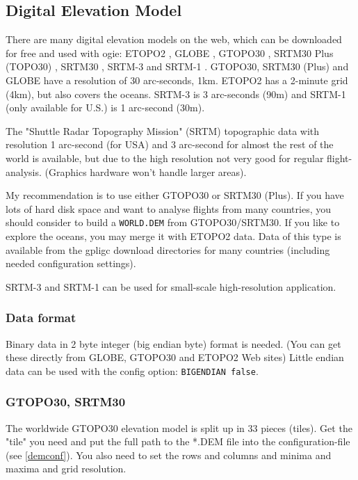 

\subsection{Digital Elevation Model}
\label{dem}

There are many digital elevation models on the web, which can be downloaded for free and used with ogie:
ETOPO2 \cite{etopo2}, GLOBE \cite{globe}, GTOPO30 \cite{gtopo30}, SRTM30 Plus (TOPO30) \cite{srtm30plus}, SRTM30 \cite{srtmv2}, SRTM-3 \cite{srtmv2} and SRTM-1 \cite{srtmv2}.
GTOPO30, SRTM30 (Plus) and GLOBE have a resolution of 30 arc-seconds, 1km.
ETOPO2 has a 2-minute grid (4km), but also covers the oceans.
SRTM-3 is 3 arc-seconds (90m) and SRTM-1 (only available for U.S.) is 1 arc-second (30m).

The "Shuttle Radar Topography Mission" (SRTM) topographic data
with resolution 1 arc-second (for USA) and 3 arc-second for almost the rest of the world
is available, but due to the high resolution not very good for regular flight-analysis. (Graphics
hardware won't handle larger areas).

My recommendation is to use either GTOPO30 or SRTM30 (Plus). 
If you have lots of hard disk space and want to analyse flights from many countries, you should consider
to build a \texttt{WORLD.DEM} from GTOPO30/SRTM30. If you like to explore the oceans, you may merge
it with ETOPO2 data. Data of this type is available from the gpligc download directories for many countries (including needed configuration settings).

SRTM-3 and SRTM-1 can be used for small-scale high-resolution application.


\subsubsection*{Data format}

Binary data in 2 byte integer (big endian byte) format is needed.
(You can get these directly from GLOBE, GTOPO30 and ETOPO2 Web sites)
Little endian data can be used with the config option: \texttt{BIGENDIAN false}.


\subsubsection{GTOPO30, SRTM30}
The worldwide GTOPO30 \cite{gtopo30} elevation model is split up in 33 pieces (tiles).
Get the "tile" you need and put the full path to the *.DEM file into the
configuration-file (see \ref{demconf}). You also need to set the rows and columns
and minima and maxima and grid resolution.

